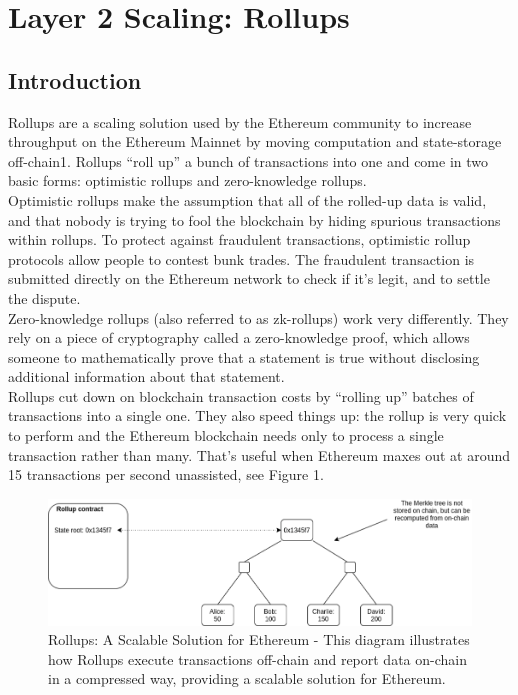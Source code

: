 \chapter{Layer 2 Scaling: Rollups}

\section{Introduction}
Rollups are a scaling solution used by the Ethereum community to increase throughput on the Ethereum Mainnet by moving computation and state-storage off-chain1. Rollups “roll up” a bunch of transactions into one and come in two basic forms: optimistic rollups and zero-knowledge rollups.\\
Optimistic rollups make the assumption that all of the rolled-up data is valid, and that nobody is trying to fool the blockchain by hiding spurious transactions within rollups. To protect against fraudulent transactions, optimistic rollup protocols allow people to contest bunk trades. The fraudulent transaction is submitted directly on the Ethereum network to check if it’s legit, and to settle the dispute.\\
Zero-knowledge rollups (also referred to as zk-rollups) work very differently. They rely on a piece of cryptography called a zero-knowledge proof, which allows someone to mathematically prove that a statement is true without disclosing additional information about that statement.\\
Rollups cut down on blockchain transaction costs by “rolling up” batches of transactions into a single one. They also speed things up: the rollup is very quick to perform and the Ethereum blockchain needs only to process a single transaction rather than many. That’s useful when Ethereum maxes out at around 15 transactions per second unassisted, see Figure 1.
\begin{center}
	\begin{figure}
		\centering
		\includegraphics[width=0.8\linewidth]{Fig/14/F1}
		\caption{Rollups: A Scalable Solution for Ethereum - This diagram illustrates how Rollups execute transactions off-chain and report data on-chain in a compressed way, providing a scalable solution for Ethereum.
		}
		\label{fig:f1}
	\end{figure}
\end{center}
